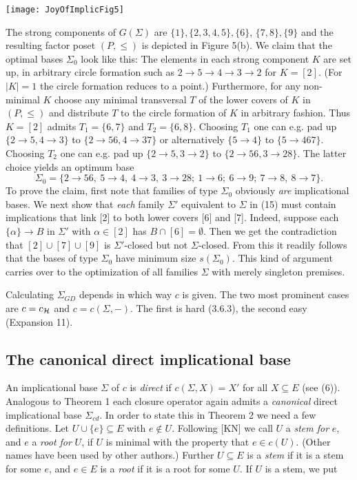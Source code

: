 \documentclass[11pt]{article}
\newcommand{\ra}{\rightarrow}
\begin{document}
\begin{center}
\texttt{[image: JoyOfImplicFig5]}
\end{center}


The strong components of $G(\Sigma)$ are $\{1\}, \{2,3,4, 5\}, \{6\}$, $\{7,8\}, \{9\}$ and the resulting factor poset $(P, \leq)$ is depicted in Figure 5(b). We claim that the optimal bases $\Sigma_0$ look like this: The elements in each strong component $K$ are set up, in arbitrary circle formation such as $2 \ra 5 \ra 4 \ra 3 \ra 2$ for $K = [2]$. (For $|K| =1$ the circle formation reduces to a point.) Furthermore, for any non-minimal $K$ choose any minimal transversal $T$ of the lower covers of $K$ in $(P, \leq)$ and distribute $T$ to the circle formation of $K$ in arbitrary fashion. Thus $K = [2]$ admits $T_1 = \{6,7\}$ and $T_2 = \{6,8\}$. Choosing $T_1$ one can e.g. pad up $\{2 \ra 5, 4 \ra 3\}$ to $\{2 \ra 56, 4 \ra 37\}$ or alternatively $\{5 \ra 4\}$ to $\{5 \ra 467\}$. Choosing $T_2$ one can e.g. pad up $\{2 \ra 5, 3 \ra 2\}$ to $\{2 \ra 56, 3 \ra 28\}$. The latter choice yields an optimum base
$$\Sigma_0 = \{2 \ra 56, \ 5 \ra 4, \ 4 \ra 3, \ 3 \ra 28; \ 1 \ra 6; \ 6 \ra 9; \ 7 \ra 8, \ 8 \ra 7\}.$$
To prove the claim, first note that families of type $\Sigma_0$ obviously {\it are} implicational bases. We next show that {\it each} family $\Sigma'$ equivalent to $\Sigma$ in (15) must contain implications that link [2] to both lower covers [6] and [7]. Indeed, suppose each $\{\alpha \} \ra B$ in $\Sigma'$ with $\alpha \in [2]$ has $B \cap [6] = \emptyset$. Then we get the contradiction that $[2] \cup [7] \cup [9]$ is $\Sigma'$-closed but not $\Sigma$-closed. From this it readily follows that the bases of type $\Sigma_0$ have minimum size $s(\Sigma_0)$. This kind of argument carries over to the optimization of all families $\Sigma$ with merely singleton premises.

Calculating $\Sigma_{GD}$ depends in which way $c$ is given. The two most prominent cases are $c = c_{\cal H}$ and $c = c(\Sigma, -)$.
The first is hard (3.6.3), the second easy (Expansion 11).

\subsection{The canonical direct implicational base}

An implicational base $\Sigma$ of $c$ is {\it direct} if $c(\Sigma, X) = X'$ for all $X \subseteq E$ (see (6)).
Analogous to Theorem 1 each closure operator again admits a {\it canonical} direct implicational base $\Sigma_{cd}$. In order to state this in Theorem 2 we need a few definitions.
Let $U \cup \{e\} \subseteq E$ with $e \not\in U$. Following [KN] we call $U$ a {\it stem for} $e$, and $e$ a {\it root for} $U$, if $U$ is minimal with the property that $e \in c(U)$. (Other names have been used by other authors.) Further $U \subseteq E$ is a {\it stem} if it is a stem for some $e$, and $e \in E$ is a {\it root} if it is a root for some $U$. If $U$ is a stem, we put
\end{document}
